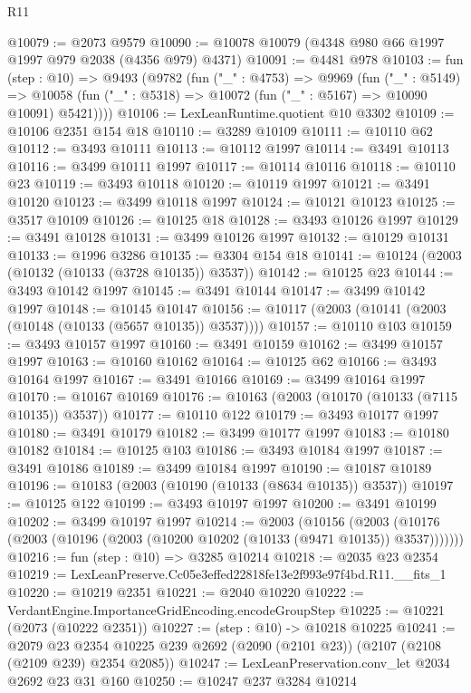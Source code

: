 \begin{lexlean}{R11}
\begin{coremodule}
@10079 := @2073 @9579
@10090 := @10078 @10079 (@4348 @980 @66 @1997 @1997 @979 @2038 (@4356 @979) @4371)
@10091 := @4481 @978
@10103 := fun (step : @10) =>
  @9493
    (@9782
      (fun ("_" : @4753) =>
      @9969
        (fun ("_" : @5149) =>
        @10058 (fun ("_" : @5318) => @10072 (fun ("_" : @5167) => @10090 @10091) @5421))))
@10106 := LexLeanRuntime.quotient @10 @3302
@10109 := @10106 @2351 @154 @18
@10110 := @3289 @10109
@10111 := @10110 @62
@10112 := @3493 @10111
@10113 := @10112 @1997
@10114 := @3491 @10113
@10116 := @3499 @10111 @1997
@10117 := @10114 @10116
@10118 := @10110 @23
@10119 := @3493 @10118
@10120 := @10119 @1997
@10121 := @3491 @10120
@10123 := @3499 @10118 @1997
@10124 := @10121 @10123
@10125 := @3517 @10109
@10126 := @10125 @18
@10128 := @3493 @10126 @1997
@10129 := @3491 @10128
@10131 := @3499 @10126 @1997
@10132 := @10129 @10131
@10133 := @1996 @3286
@10135 := @3304 @154 @18
@10141 := @10124 (@2003 (@10132 (@10133 (@3728 @10135)) @3537))
@10142 := @10125 @23
@10144 := @3493 @10142 @1997
@10145 := @3491 @10144
@10147 := @3499 @10142 @1997
@10148 := @10145 @10147
@10156 := @10117 (@2003 (@10141 (@2003 (@10148 (@10133 (@5657 @10135)) @3537))))
@10157 := @10110 @103
@10159 := @3493 @10157 @1997
@10160 := @3491 @10159
@10162 := @3499 @10157 @1997
@10163 := @10160 @10162
@10164 := @10125 @62
@10166 := @3493 @10164 @1997
@10167 := @3491 @10166
@10169 := @3499 @10164 @1997
@10170 := @10167 @10169
@10176 := @10163 (@2003 (@10170 (@10133 (@7115 @10135)) @3537))
@10177 := @10110 @122
@10179 := @3493 @10177 @1997
@10180 := @3491 @10179
@10182 := @3499 @10177 @1997
@10183 := @10180 @10182
@10184 := @10125 @103
@10186 := @3493 @10184 @1997
@10187 := @3491 @10186
@10189 := @3499 @10184 @1997
@10190 := @10187 @10189
@10196 := @10183 (@2003 (@10190 (@10133 (@8634 @10135)) @3537))
@10197 := @10125 @122
@10199 := @3493 @10197 @1997
@10200 := @3491 @10199
@10202 := @3499 @10197 @1997
@10214 := @2003
    (@10156 (@2003 (@10176 (@2003 (@10196 (@2003 (@10200 @10202 (@10133 (@9471 @10135)) @3537)))))))
@10216 := fun (step : @10) => @3285 @10214
@10218 := @2035 @23 @2354
@10219 := LexLeanPreserve.Cc05e3effed22818fe13e2f993e97f4bd.R11.__fits_1
@10220 := @10219 @2351
@10221 := @2040 @10220
@10222 := VerdantEngine.ImportanceGridEncoding.encodeGroupStep
@10225 := @10221 (@2073 (@10222 @2351))
@10227 := (step : @10) -> @10218 @10225
@10241 := @2079
    @23
    @2354
    @10225
    @239
    @2692
    (@2090 (@2101 @23))
    (@2107 (@2108 (@2109 @239) @2354 @2085))
@10247 := LexLeanPreservation.conv_let @2034 @2692 @23 @31 @160
@10250 := @10247 @237 @3284 @10214

\end{coremodule}
\end{lexlean}
